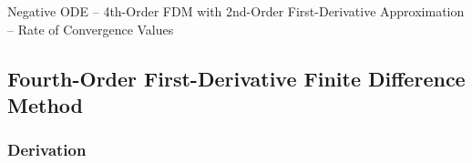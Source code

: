 \documentclass[10pt, reqno]{article}		%
\numberwithin{equation}{section}
\begin{document}
\vfill

\begin{table}[H]
	
	\caption{Negative ODE -- 4th-Order FDM with 2nd-Order First-Derivative Approximation -- Rate of Convergence Values}	
\end{table}

\newpage

\subsection{Fourth-Order First-Derivative Finite Difference Method}

\subsubsection{Derivation}
\end{document}
